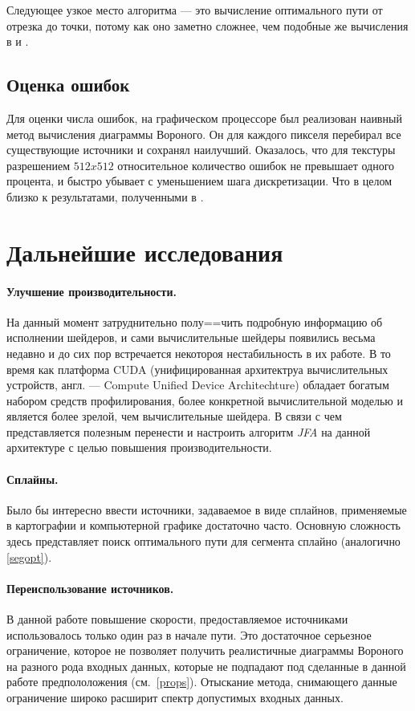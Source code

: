 \documentclass[12pt]{article}
\begin{document}
Следующее узкое место алгоритма --- это вычисление оптимального пути от отрезка
до точки, потому как оно заметно сложнее, чем подобные же вычисления в \cite{jfa} и 
\cite{gvd}.

\subsection{Оценка ошибок}
Для оценки числа ошибок, на графическом процессоре был реализован наивный метод
вычисления диаграммы Вороного. Он для каждого пикселя перебирал все 
существующие источники и сохранял наилучший. Оказалось, что для текстуры 
разрешением $512x512$ относительное количество ошибок не превышает одного процента,
и быстро убывает с уменьшением шага дискретизации. Что в целом близко к
результатами, полученными в \cite{gvd}.

\section{Дальнейшие исследования}
\paragraph{Улучшение производительности.} На данный момент затруднительно полу==чить
подробную информацию об исполнении шейдеров, и сами вычислительные шейдеры появились
весьма недавно и до сих пор встречается некотороя нестабильность в их работе. В то 
время как платформа CUDA (унифицированная архитектруа вычислительных устройств, англ. 
--- Compute Unified Device Architechture) обладает богатым набором средств 
профилирования, более конкретной вычислительной моделью и является более зрелой, чем
вычислительные шейдера. В связи с чем представляется полезным перенести и настроить
алгоритм  \emph{JFA} на данной архитектуре с целью повышения производительности.

\paragraph{Сплайны.} Было бы интересно ввести источники, задаваемое в виде сплайнов,
применяемые в картографии и компьютерной графике достаточно часто. Основную сложность
здесь представляет поиск оптимального пути для сегмента сплайно (аналогично \ref{segopt}).

\paragraph{Переиспользование источников.} В данной работе повышение скорости, 
предоставляемое источниками использовалось только один раз в начале пути.
Это достаточное серьезное ограничение, которое не позволяет получить реалистичные
диаграммы Вороного на разного рода входных данных, которые не подпадают под 
сделанные в данной работе предпололожения (см.~\ref{props}). Отыскание метода,
снимающего данные ограничение широко расширит спектр допустимых входных данных.
\end{document}
